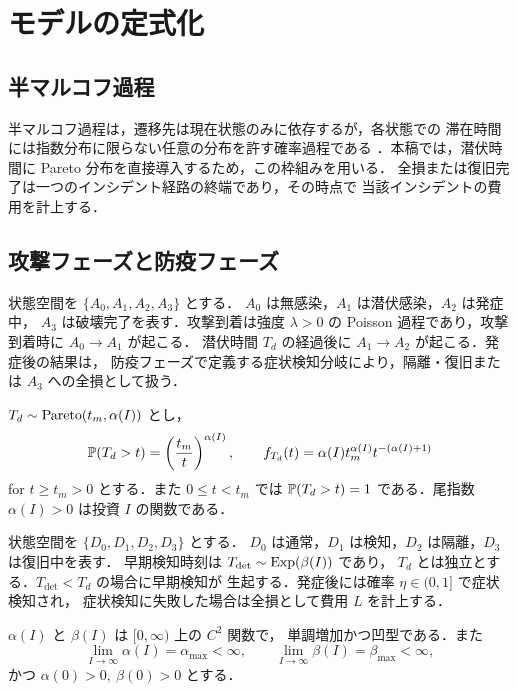 \section{モデルの定式化}

\subsection{半マルコフ過程}

半マルコフ過程は，遷移先は現在状態のみに依存するが，各状態での
滞在時間には指数分布に限らない任意の分布を許す確率過程である
\cite{limnios2001,cinlar1975,howard1971}．本稿では，潜伏時間に
Pareto 分布を直接導入するため，この枠組みを用いる．
全損または復旧完了は一つのインシデント経路の終端であり，その時点で
当該インシデントの費用を計上する．

\subsection{攻撃フェーズと防疫フェーズ}

\begin{definition}[攻撃フェーズ]
状態空間を $\{A_0,A_1,A_2,A_3\}$ とする．
$A_0$ は無感染，$A_1$ は潜伏感染，$A_2$ は発症中，
$A_3$ は破壊完了を表す．攻撃到着は強度 $\lambda>0$ の
Poisson 過程であり，攻撃到着時に $A_0\to A_1$ が起こる．
潜伏時間 $T_d$ の経過後に $A_1\to A_2$ が起こる．発症後の結果は，
防疫フェーズで定義する症状検知分岐により，隔離・復旧または
$A_3$ への全損として扱う．
\end{definition}

\begin{assumption}
$T_d\sim\mathrm{Pareto}(t_m,\alpha(I))$ とし，
\[
  \mathbb{P}(T_d>t)=\left(\frac{t_m}{t}\right)^{\alpha(I)},\qquad
  f_{T_d}(t)=\alpha(I)t_m^{\alpha(I)}t^{-(\alpha(I)+1)}
\]
for $t\ge t_m>0$ とする．また $0\le t<t_m$ では
$\mathbb{P}(T_d>t)=1$ である．尾指数 $\alpha(I)>0$ は投資 $I$ の関数である．
\end{assumption}

\begin{definition}[防疫フェーズ]
状態空間を $\{D_0,D_1,D_2,D_3\}$ とする．
$D_0$ は通常，$D_1$ は検知，$D_2$ は隔離，$D_3$ は復旧中を表す．
早期検知時刻は $T_{\mathrm{det}}\sim\mathrm{Exp}(\beta(I))$ であり，
$T_d$ とは独立とする．$T_{\mathrm{det}}<T_d$ の場合に早期検知が
生起する．発症後には確率 $\eta\in(0,1]$ で症状検知され，
症状検知に失敗した場合は全損として費用 $L$ を計上する．
\end{definition}

\begin{assumption}[投資応答関数]
$\alpha(I)$ と $\beta(I)$ は $[0,\infty)$ 上の $C^2$ 関数で，
単調増加かつ凹型である．また
\[
  \lim_{I\to\infty}\alpha(I)=\alpha_{\max}<\infty,\qquad
  \lim_{I\to\infty}\beta(I)=\beta_{\max}<\infty,
\]
かつ $\alpha(0)>0,\ \beta(0)>0$ とする．
\end{assumption}

